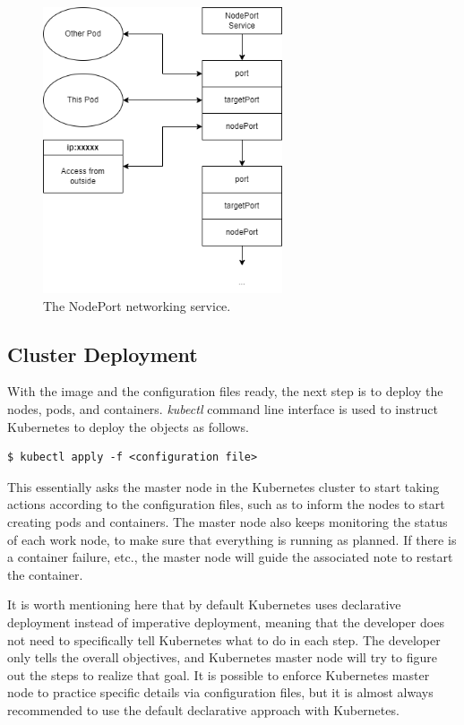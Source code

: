 \begin{figure}
	\centering
	\includegraphics[width=200pt]{chapters/ch-virtualization-and-containerization/figures/nodeport.png}
	\caption{The NodePort networking service.} \label{ch:vac:fig:nodeport}
\end{figure}

\subsection{Cluster Deployment}

With the image and the configuration files ready, the next step is to deploy the nodes, pods, and containers. \textit{kubectl} command line interface is used to instruct Kubernetes to deploy the objects as follows.
\begin{lstlisting}
$ kubectl apply -f <configuration file>
\end{lstlisting}
This essentially asks the master node in the Kubernetes cluster to start taking actions according to the configuration files, such as to inform the nodes to start creating pods and containers. The master node also keeps monitoring the status of each work node, to make sure that everything is running as planned. If there is a container failure, etc., the master node will guide the associated note to restart the container.

It is worth mentioning here that by default Kubernetes uses declarative deployment instead of imperative deployment, meaning that the developer does not need to specifically tell Kubernetes what to do in each step. The developer only tells the overall objectives, and Kubernetes master node will try to figure out the steps to realize that goal. It is possible to enforce Kubernetes master node to practice specific details via configuration files, but it is almost always recommended to use the default declarative approach with Kubernetes.

